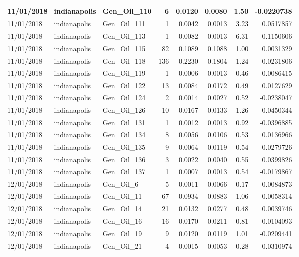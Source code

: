 \documentclass[
  letterpaper,
  DIV=11,
  numbers=noendperiod]{scrartcl}
\begin{document}
\begin{tabular}{l|l|l|r|r|r|r|r}
\hline
11/01/2018 & indianapolis & Gen\_Oil\_110 & 6 & 0.0120 & 0.0080 & 1.50 & -0.0220738\\
\hline
11/01/2018 & indianapolis & Gen\_Oil\_111 & 1 & 0.0042 & 0.0013 & 3.23 & 0.0517857\\
\hline
11/01/2018 & indianapolis & Gen\_Oil\_113 & 1 & 0.0082 & 0.0013 & 6.31 & -0.1150606\\
\hline
11/01/2018 & indianapolis & Gen\_Oil\_115 & 82 & 0.1089 & 0.1088 & 1.00 & 0.0031329\\
\hline
11/01/2018 & indianapolis & Gen\_Oil\_118 & 136 & 0.2230 & 0.1804 & 1.24 & -0.0231806\\
\hline
11/01/2018 & indianapolis & Gen\_Oil\_119 & 1 & 0.0006 & 0.0013 & 0.46 & 0.0086415\\
\hline
11/01/2018 & indianapolis & Gen\_Oil\_122 & 13 & 0.0084 & 0.0172 & 0.49 & 0.0127629\\
\hline
11/01/2018 & indianapolis & Gen\_Oil\_124 & 2 & 0.0014 & 0.0027 & 0.52 & -0.0238047\\
\hline
11/01/2018 & indianapolis & Gen\_Oil\_126 & 10 & 0.0167 & 0.0133 & 1.26 & -0.0450344\\
\hline
11/01/2018 & indianapolis & Gen\_Oil\_131 & 1 & 0.0012 & 0.0013 & 0.92 & -0.0396885\\
\hline
11/01/2018 & indianapolis & Gen\_Oil\_134 & 8 & 0.0056 & 0.0106 & 0.53 & 0.0136966\\
\hline
11/01/2018 & indianapolis & Gen\_Oil\_135 & 9 & 0.0064 & 0.0119 & 0.54 & 0.0279726\\
\hline
11/01/2018 & indianapolis & Gen\_Oil\_136 & 3 & 0.0022 & 0.0040 & 0.55 & 0.0399826\\
\hline
11/01/2018 & indianapolis & Gen\_Oil\_137 & 1 & 0.0007 & 0.0013 & 0.54 & -0.0179867\\
\hline
12/01/2018 & indianapolis & Gen\_Oil\_6 & 5 & 0.0011 & 0.0066 & 0.17 & 0.0084873\\
\hline
12/01/2018 & indianapolis & Gen\_Oil\_11 & 67 & 0.0934 & 0.0883 & 1.06 & 0.0058314\\
\hline
12/01/2018 & indianapolis & Gen\_Oil\_14 & 21 & 0.0132 & 0.0277 & 0.48 & 0.0039746\\
\hline
12/01/2018 & indianapolis & Gen\_Oil\_16 & 16 & 0.0170 & 0.0211 & 0.81 & -0.0104093\\
\hline
12/01/2018 & indianapolis & Gen\_Oil\_19 & 9 & 0.0120 & 0.0119 & 1.01 & -0.0209441\\
\hline
12/01/2018 & indianapolis & Gen\_Oil\_21 & 4 & 0.0015 & 0.0053 & 0.28 & -0.0310974\\

\end{tabular}
\end{document}
